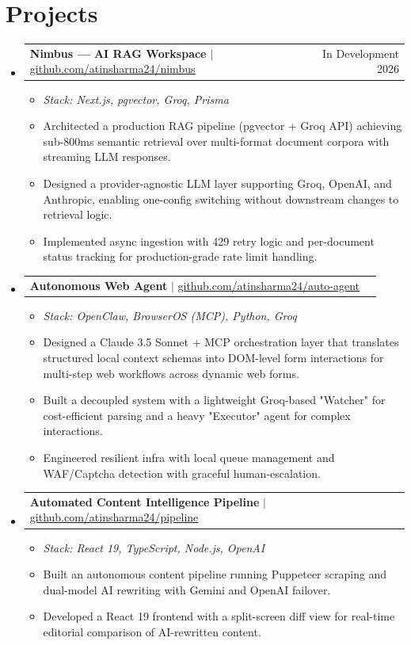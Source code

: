 \documentclass[a4paper,10pt]{article}
\makeatletter
\newcommand{\resumeItem}[1]{
  \item\small{{#1 \vspace{-2pt}}}
}
\newcommand{\resumeProjectHeading}[2]{
    \item
    \begin{tabular*}{\textwidth}{l@{\extracolsep{\fill}}r}
      \small#1 & #2 \\
    \end{tabular*}\vspace{-7pt}
}
\newcommand{\resumeSubHeadingListStart}{\begin{itemize}[leftmargin=0.15in, label={}]}
\newcommand{\resumeSubHeadingListEnd}{\end{itemize}}
\newcommand{\resumeItemListStart}{\begin{itemize}}
\newcommand{\resumeItemListEnd}{\end{itemize}\vspace{-5pt}}
\makeatother
\begin{document}
\section{Projects}
    \resumeSubHeadingListStart
      \resumeProjectHeading
          {\textbf{Nimbus --- AI RAG Workspace} $|$ \href{https://github.com/atinsharma24/nimbus}{\underline{github.com/atinsharma24/nimbus}}}{In Development 2026}
          \resumeItemListStart
            \resumeItem{\emph{Stack: Next.js, pgvector, Groq, Prisma}}
            \resumeItem{Architected a production RAG pipeline (pgvector + Groq API) achieving sub-800ms semantic retrieval over multi-format document corpora with streaming LLM responses.}
            \resumeItem{Designed a provider-agnostic LLM layer supporting Groq, OpenAI, and Anthropic, enabling one-config switching without downstream changes to retrieval logic.}
            \resumeItem{Implemented async ingestion with 429 retry logic and per-document status tracking for production-grade rate limit handling.}
          \resumeItemListEnd
          
      \resumeProjectHeading
          {\textbf{Autonomous Web Agent} $|$ \href{https://github.com/atinsharma24/autonomous-web-agent}{\underline{github.com/atinsharma24/auto-agent}}}{}
          \resumeItemListStart
            \resumeItem{\emph{Stack: OpenClaw, BrowserOS (MCP), Python, Groq}}
            \resumeItem{Designed a Claude 3.5 Sonnet + MCP orchestration layer that translates structured local context schemas into DOM-level form interactions for multi-step web workflows across dynamic web forms.}
            \resumeItem{Built a decoupled system with a lightweight Groq-based "Watcher" for cost-efficient parsing and a heavy "Executor" agent for complex interactions.}
            \resumeItem{Engineered resilient infra with local queue management and WAF/Captcha detection with graceful human-escalation.}
          \resumeItemListEnd

      \resumeProjectHeading
          {\textbf{Automated Content Intelligence Pipeline} $|$ \href{https://github.com/atinsharma24/content-pipeline}{\underline{github.com/atinsharma24/pipeline}}}{}
          \resumeItemListStart
            \resumeItem{\emph{Stack: React 19, TypeScript, Node.js, OpenAI}}
            \resumeItem{Built an autonomous content pipeline running Puppeteer scraping and dual-model AI rewriting with Gemini and OpenAI failover.}
            \resumeItem{Developed a React 19 frontend with a split-screen diff view for real-time editorial comparison of AI-rewritten content.}
          \resumeItemListEnd
    \resumeSubHeadingListEnd
\end{document}
